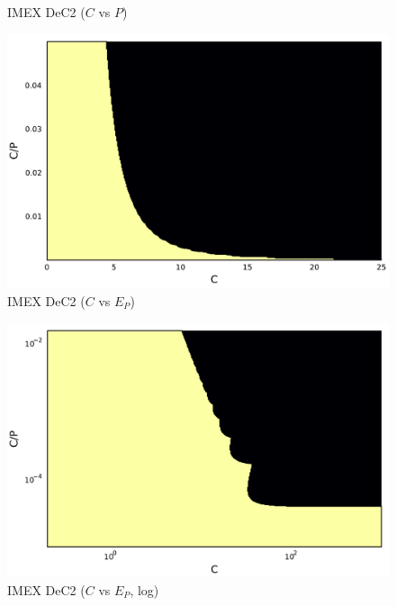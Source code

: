 \begin{example}
\begin{figure}[!h]
\begin{minipage}[t]{0.32\textwidth}
			IMEX DeC2 ($C$ vs $P$)
		\end{minipage}
		\begin{minipage}[t]{0.32\textwidth}
			\centering
			\includegraphics[width=\textwidth]{pdf/pdepics/disp/contourf_adv_disp_IMEXDeC_gaussLobatto_2_disp_Shu_adv_1_CE.pdf}
			IMEX DeC2 ($C$ vs $E_P$)
		\end{minipage}
		\begin{minipage}[t]{0.32\textwidth}
		\centering
		\includegraphics[width=\textwidth]{pdf/pdepics/disp/contourf_adv_disp_IMEXDeC_equispaced_2_disp_Shu_adv_1_CE_zoom.pdf}
		IMEX DeC2 ($C$ vs $E_P$, log)
		\end{minipage}\\
		\begin{minipage}[t]{0.32\textwidth}
			\centering

\end{minipage}
\end{figure}
\end{example}
